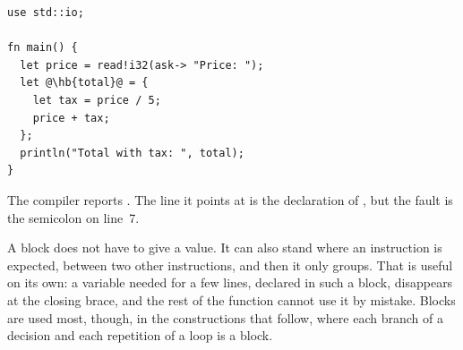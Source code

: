 \begin{lstlisting}[style=coloredverbatimError, escapechar=@, caption=A block whose last expression ends with a semicolon]
use std::io;

fn main() {
  let price = read!i32(ask-> "Price: ");
  let @\hb{total}@ = {
    let tax = price / 5;
    price + tax;
  };
  println("Total with tax: ", total);
}
\end{lstlisting}

The compiler reports .
The line it points at is the declaration of , but the fault is the
semicolon on line~7.

A block does not have to give a value. It can also stand where an instruction is
expected, between two other instructions, and then it only groups. That is
useful on its own: a variable needed for a few lines, declared in such a block,
disappears at the closing brace, and the rest of the function cannot use it by
mistake. Blocks are used most, though, in the constructions that follow, where
each branch of a decision and each repetition of a loop is a block.
